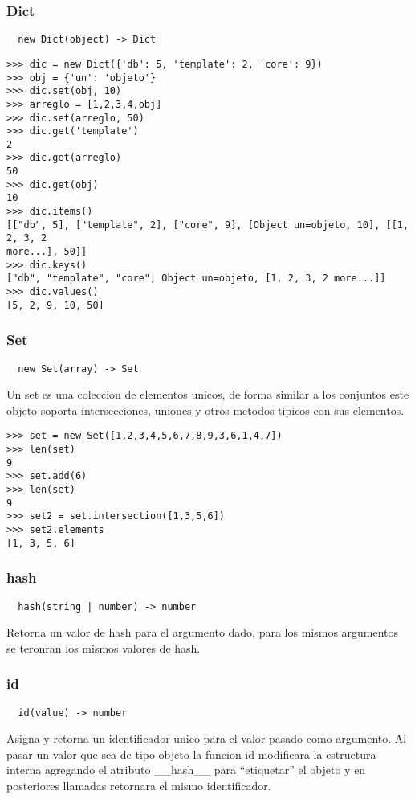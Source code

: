 \subsubsection*{Dict}
\begin{verbatim}
  new Dict(object) -> Dict
\end{verbatim}
\begin{lstlisting}[style=consola]
>>> dic = new Dict({'db': 5, 'template': 2, 'core': 9})
>>> obj = {'un': 'objeto'}
>>> dic.set(obj, 10)
>>> arreglo = [1,2,3,4,obj]
>>> dic.set(arreglo, 50)
>>> dic.get('template')
2
>>> dic.get(arreglo)
50
>>> dic.get(obj)
10
>>> dic.items()
[["db", 5], ["template", 2], ["core", 9], [Object un=objeto, 10], [[1, 2, 3, 2
more...], 50]]
>>> dic.keys()
["db", "template", "core", Object un=objeto, [1, 2, 3, 2 more...]]
>>> dic.values()
[5, 2, 9, 10, 50]
\end{lstlisting}

\subsubsection*{Set}
\begin{verbatim}
  new Set(array) -> Set
\end{verbatim}
Un set es una coleccion de elementos unicos, de forma similar a los conjuntos este objeto soporta intersecciones, uniones y otros metodos tipicos con sus elementos.
\begin{lstlisting}[style=consola]
>>> set = new Set([1,2,3,4,5,6,7,8,9,3,6,1,4,7])
>>> len(set)
9
>>> set.add(6)
>>> len(set)
9
>>> set2 = set.intersection([1,3,5,6])
>>> set2.elements
[1, 3, 5, 6]
\end{lstlisting}

\subsubsection*{hash}
\begin{verbatim}
  hash(string | number) -> number
\end{verbatim}
Retorna un valor de hash para el argumento dado, para los mismos argumentos se
teronran los mismos valores de hash.

\subsubsection*{id}
\begin{verbatim}
  id(value) -> number
\end{verbatim}
Asigna y retorna un identificador unico para el valor pasado como argumento.
Al pasar un valor que sea de tipo objeto la funcion id modificara la
estructura interna agregando el atributo __hash__ para ``etiquetar''
el objeto y en posteriores llamadas retornara el mismo identificador.

